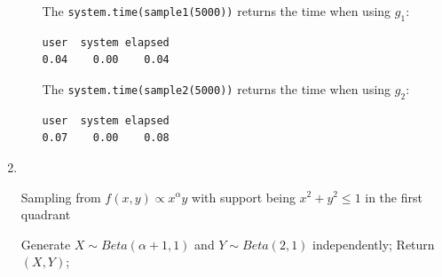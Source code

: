 \documentclass{article}
\begin{document}
\begin{enumerate}[leftmargin = 0 em, label = \arabic*., font = \bfseries]
\begin{enumerate}
		The \verb|system.time(sample1(5000))| returns the time when using $g_1$:
		\begin{verbatim}
user  system elapsed 
0.04    0.00    0.04 
		\end{verbatim}

		The \verb|system.time(sample2(5000))| returns the time when using $g_2$:
		\begin{verbatim}
user  system elapsed 
0.07    0.00    0.08 
		\end{verbatim}
	\end{enumerate}
	
	\item 

	\

	\begin{algorithm}
		\caption{Sampling from $f(x,y) \propto x^{\alpha}y$ with support being $x^2 + y^2 \leq 1$ in the first quadrant}
		\begin{algorithmic}[1]
			\State  Generate $X \sim Beta(\alpha + 1, 1)$ and $Y \sim Beta(2,1)$ independently;
			  \Else \Statex Return $(X,Y)$;\EndIf
		\end{algorithmic}
	\end{algorithm}
	

 	\end{enumerate}


	
	
	
	
\end{document}
